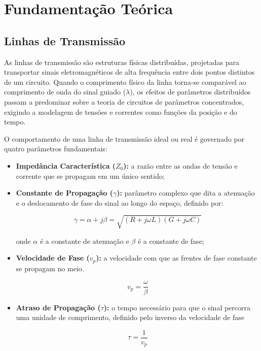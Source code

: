 \documentclass[12pt,a4paper]{report}
\begin{document}

\chapter{Fundamentação Teórica}

\section{Linhas de Transmissão}

As linhas de transmissão são estruturas físicas distribuídas, projetadas para transportar sinais eletromagnéticos de alta frequência entre dois pontos distintos de um circuito. Quando o comprimento físico da linha torna-se comparável ao comprimento de onda do sinal guiado ($\lambda$), os efeitos de parâmetros distribuídos passam a predominar sobre a teoria de circuitos de parâmetros concentrados, exigindo a modelagem de tensões e correntes como funções da posição e do tempo.

O comportamento de uma linha de transmissão ideal ou real é governado por quatro parâmetros fundamentais:

\begin{itemize}
    \item \textbf{Impedância Característica ($Z_0$):} a razão entre as ondas de tensão e corrente que se propagam em um único sentido;
    \item \textbf{Constante de Propagação ($\gamma$):} parâmetro complexo que dita a atenuação e o deslocamento de fase do sinal ao longo do espaço, definido por:
    
    \begin{equation}
    \boxed{
        \gamma = \alpha + j\beta = \sqrt{(R + j\omega L)(G + j\omega C)}
    }
    \end{equation}
    
    onde $\alpha$ é a constante de atenuação e $\beta$ é a constante de fase;
    
    \item \textbf{Velocidade de Fase ($v_p$):} a velocidade com que as frentes de fase constante se propagam no meio.

    \begin{equation}
    \boxed{v_p = \frac{\omega}{\beta}}
    \end{equation}

    \newpage
     
    \item \textbf{Atraso de Propagação ($\tau$):} o tempo necessário para que o sinal percorra uma unidade de comprimento, definido pelo inverso da velocidade de fase 
    
    \begin{equation}
    \boxed{\tau = \frac{1}{v_p}}
    \end{equation}
    
\end{itemize}
\end{document}
